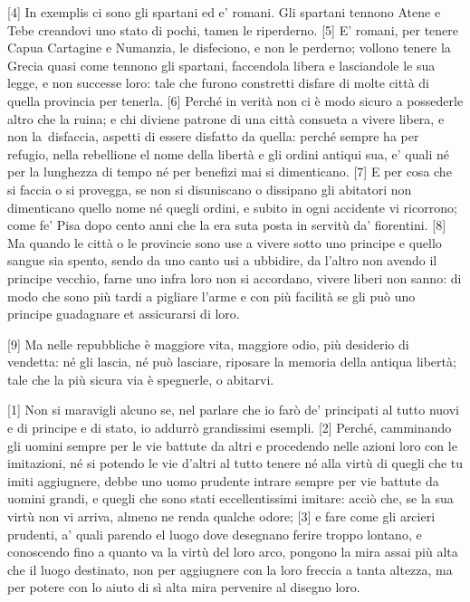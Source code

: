 {[}4{]} In exemplis ci sono gli spartani ed e' romani. Gli spartani
tennono Atene e Tebe creandovi uno stato di pochi, tamen le riperderno.
{[}5{]} E' romani, per tenere Capua Cartagine e Numanzia, le disfeciono,
e non le perderno; vollono tenere la Grecia quasi come tennono gli
spartani, faccendola libera e lasciandole le sua legge, e non successe
loro: tale che furono constretti disfare di molte città di quella
provincia per tenerla. {[}6{]} Perché in verità non ci è modo sicuro a
possederle altro che la ruina; e chi diviene patrone di una città
consueta a vivere libera, e non la\est\ disfaccia, aspetti di essere disfatto
da quella: perché sempre ha per refugio, nella rebellione el nome della
libertà e gli ordini antiqui sua, e' quali né per la lunghezza di tempo
né per benefizi mai si dimenticano. {[}7{]} E per cosa che si faccia o
si provegga, se non si disuniscano o dissipano gli abitatori non
dimenticano quello nome né quegli ordini, e subito in ogni accidente vi
ricorrono; come fe' Pisa dopo cento anni che la era suta posta in
servitù da' fiorentini. {[}8{]} Ma quando le città o le provincie sono
use a vivere sotto uno principe e quello sangue sia spento, sendo da uno
canto usi a ubbidire, da l'altro non avendo il principe vecchio, farne
uno infra loro non si accordano, vivere liberi non sanno: di modo che
sono più tardi a pigliare l'arme e con più facilità se gli può uno
principe guadagnare et assicurarsi di loro.

{[}9{]} Ma nelle repubbliche è maggiore vita, maggiore odio, più
desiderio di vendetta: né gli lascia, né può lasciare, riposare la
memoria della antiqua libertà; tale che la più sicura via è spegnerle, o
abitarvi.


{[}1{]} Non si maravigli alcuno se, nel parlare che io farò de'
principati al tutto nuovi e di principe e di stato, io addurrò
grandissimi esempli. {[}2{]} Perché, camminando gli uomini sempre per le
vie battute da altri e procedendo nelle azioni loro con le imitazioni,
né si potendo le vie d'altri al tutto tenere né alla virtù di quegli che
tu imiti aggiugnere, debbe uno uomo prudente intrare sempre per vie
battute da uomini grandi, e quegli che sono stati eccellentissimi
imitare: acciò che, se la sua virtù non vi arriva, almeno ne renda
qualche odore; {[}3{]} e fare come gli arcieri prudenti, a' quali
parendo el luogo dove desegnano ferire troppo lontano, e conoscendo fino
a quanto va la virtù del loro arco, pongono la mira assai più alta che
il luogo destinato, non per aggiugnere con la loro freccia a tanta
altezza, ma per potere con lo aiuto di sì alta mira pervenire al disegno
loro.

